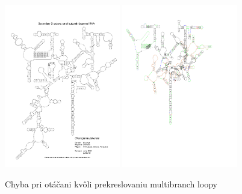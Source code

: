 \begin{figure}
  \includegraphics[width=0.45\textwidth]{../img/chyby/cicadas}
  \includegraphics[clip, trim=0.5cm 7cm 4cm 2cm,width=0.45\textwidth]{../img/chyby/cicadas-sea_scallop}
  \caption{Chyba pri otáčani kvôli prekreslovaniu multibranch loopy}
  \label{obr:chyba_rotácia_multibranch}
\end{figure}









